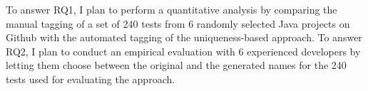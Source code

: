 To answer RQ1, I plan to perform a quantitative analysis by comparing the manual tagging of a set of \num{240} tests from \num{6} randomly selected Java projects on Github with the automated tagging of the uniqueness-based approach.
%
To answer RQ2, I plan to conduct an empirical evaluation with \num{6} experienced developers by letting them choose between the original and the generated names for the  \num{240} tests used for evaluating the approach.


